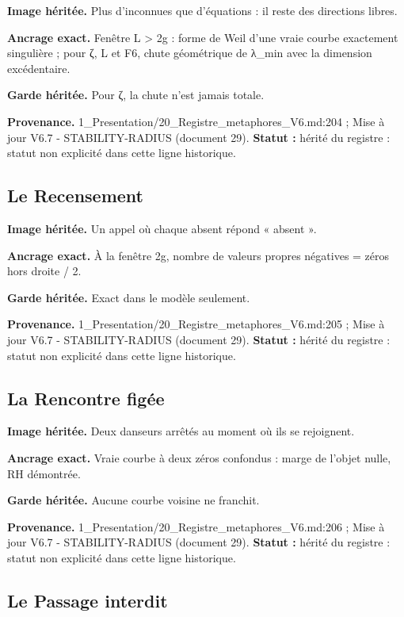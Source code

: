 \documentclass[
  9pt,
  a4paper,
]{article}
\begin{document}
\textbf{Image héritée.} Plus d'inconnues que d'équations : il reste des
directions libres.

\textbf{Ancrage exact.} Fenêtre L \textgreater{} 2g : forme de Weil
d'une vraie courbe exactement singulière ; pour ζ, L et F6, chute
géométrique de λ\_min avec la dimension excédentaire.

\textbf{Garde héritée.} Pour ζ, la chute n'est jamais totale.

\textbf{Provenance.} 1\_Presentation/20\_Registre\_metaphores\_V6.md:204
; Mise à jour V6.7 - STABILITY-RADIUS (document 29). \textbf{Statut :}
hérité du registre : statut non explicité dans cette ligne historique.

\hypertarget{le-recensement}{%
\subsection{Le Recensement}\label{le-recensement}}

\textbf{Image héritée.} Un appel où chaque absent répond « absent ».

\textbf{Ancrage exact.} À la fenêtre 2g, nombre de valeurs propres
négatives = zéros hors droite / 2.

\textbf{Garde héritée.} Exact dans le modèle seulement.

\textbf{Provenance.} 1\_Presentation/20\_Registre\_metaphores\_V6.md:205
; Mise à jour V6.7 - STABILITY-RADIUS (document 29). \textbf{Statut :}
hérité du registre : statut non explicité dans cette ligne historique.

\hypertarget{la-rencontre-figuxe9e}{%
\subsection{La Rencontre figée}\label{la-rencontre-figuxe9e}}

\textbf{Image héritée.} Deux danseurs arrêtés au moment où ils se
rejoignent.

\textbf{Ancrage exact.} Vraie courbe à deux zéros confondus : marge de
l'objet nulle, RH démontrée.

\textbf{Garde héritée.} Aucune courbe voisine ne franchit.

\textbf{Provenance.} 1\_Presentation/20\_Registre\_metaphores\_V6.md:206
; Mise à jour V6.7 - STABILITY-RADIUS (document 29). \textbf{Statut :}
hérité du registre : statut non explicité dans cette ligne historique.

\hypertarget{le-passage-interdit}{%
\subsection{Le Passage interdit}\label{le-passage-interdit}}
\end{document}
